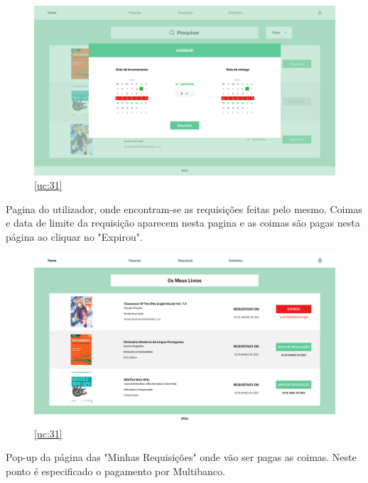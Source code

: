 \begin{figure}[H]
	\centering
	\includegraphics[width=1\linewidth]{../Mockups/PNGs/Agendar Requisitar.png}  %
	\caption{\ref{uc:31}}
	\label{fig:chap230}
\end{figure}


\newpage

Pagina do utilizador, onde encontram-se as requisições feitas pelo mesmo. Coimas e data de limite da requisição aparecem nesta pagina e as coimas são pagas nesta página ao cliquar no "Expirou".

\begin{figure}[H]
	\centering
	\includegraphics[width=1\linewidth]{../Mockups/PNGs/Minhas Requisicoes.png}  %
	\caption{\ref{uc:31}}
	\label{fig:chap230}
\end{figure}


\newpage

Pop-up da página das "Minhas Requisições" onde vão ser pagas as coimas. Neste ponto é especificado o pagamento por Multibanco.

